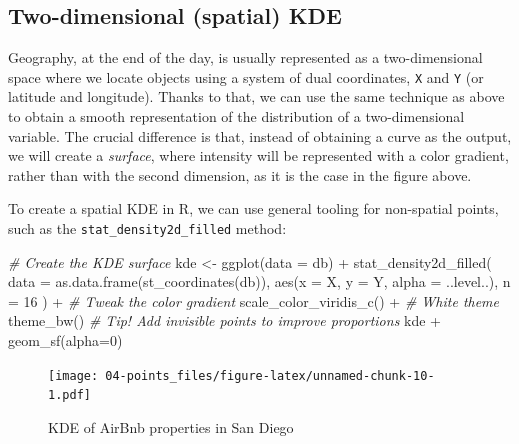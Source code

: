 \documentclass[
]{book}
\newenvironment{Shaded}{\begin{snugshade}}{\end{snugshade}}
\newcommand{\AttributeTok}[1]{\textcolor[rgb]{0.77,0.63,0.00}{#1}}
\newcommand{\CommentTok}[1]{\textcolor[rgb]{0.56,0.35,0.01}{\textit{#1}}}
\newcommand{\DecValTok}[1]{\textcolor[rgb]{0.00,0.00,0.81}{#1}}
\newcommand{\FunctionTok}[1]{\textcolor[rgb]{0.00,0.00,0.00}{#1}}
\newcommand{\NormalTok}[1]{#1}
\newcommand{\OtherTok}[1]{\textcolor[rgb]{0.56,0.35,0.01}{#1}}
\newcommand{\SpecialCharTok}[1]{\textcolor[rgb]{0.00,0.00,0.00}{#1}}
\begin{document}
\hypertarget{two-dimensional-spatial-kde}{%
\subsection{Two-dimensional (spatial) KDE}\label{two-dimensional-spatial-kde}}

Geography, at the end of the day, is usually represented as a two-dimensional space where we locate objects using a system of dual coordinates, \texttt{X} and \texttt{Y} (or latitude and longitude). Thanks to that, we can use the same technique as above to obtain a smooth representation of the distribution of a two-dimensional variable. The crucial difference is that, instead of obtaining a curve as the output, we will create a \emph{surface}, where intensity will be represented with a color gradient, rather than with the second dimension, as it is the case in the figure above.

To create a spatial KDE in R, we can use general tooling for non-spatial points, such as the \texttt{stat\_density2d\_filled} method:

\begin{Shaded}
\begin{Highlighting}[]
\CommentTok{\# Create the KDE surface}
\NormalTok{kde }\OtherTok{\textless{}{-}} \FunctionTok{ggplot}\NormalTok{(}\AttributeTok{data =}\NormalTok{ db) }\SpecialCharTok{+}
  \FunctionTok{stat\_density2d\_filled}\NormalTok{(}
    \AttributeTok{data =} \FunctionTok{as.data.frame}\NormalTok{(}\FunctionTok{st\_coordinates}\NormalTok{(db)), }
    \FunctionTok{aes}\NormalTok{(}\AttributeTok{x =}\NormalTok{ X, }\AttributeTok{y =}\NormalTok{ Y, }\AttributeTok{alpha =}\NormalTok{ ..level..),}
    \AttributeTok{n =} \DecValTok{16}
\NormalTok{  ) }\SpecialCharTok{+}
  \CommentTok{\# Tweak the color gradient}
  \FunctionTok{scale\_color\_viridis\_c}\NormalTok{() }\SpecialCharTok{+}
  \CommentTok{\# White theme}
  \FunctionTok{theme\_bw}\NormalTok{()}
\CommentTok{\# Tip! Add invisible points to improve proportions}
\NormalTok{kde }\SpecialCharTok{+} \FunctionTok{geom\_sf}\NormalTok{(}\AttributeTok{alpha=}\DecValTok{0}\NormalTok{)}
\end{Highlighting}
\end{Shaded}

\begin{figure}
\centering
\texttt{[image: 04-points\_files/figure-latex/unnamed-chunk-10-1.pdf]}
\caption{\label{fig:unnamed-chunk-10}KDE of AirBnb properties in San Diego}
\end{figure}
\end{document}
